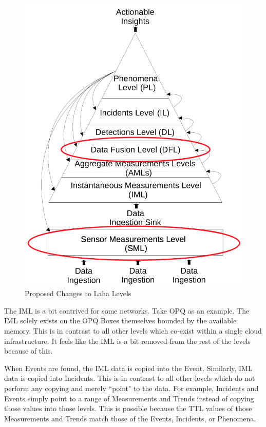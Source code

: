 \begin{figure}
    \centering
    \includegraphics[width=\linewidth]{figures/add_laha_levels.png}
    \caption{Proposed Changes to Laha Levels}
    \label{fig:add_laha_levels}
\end{figure}

The IML is a bit contrived for some networks. Take OPQ as an example. The IML solely exists on the OPQ Boxes themselves bounded by the available memory. This is in contrast to all other levels which co-exist within a single cloud infrastructure. It feels like the IML is a bit removed from the rest of the levels because of this.

When Events are found, the IML data is copied into the Event. Similarly, IML data is copied into Incidents. This is in contrast to all other levels which do not perform any copying and merely ``point" to the data. For example, Incidents and Events simply point to a range of Measurements and Trends instead of copying those values into those levels. This is possible because the TTL values of those Measurements and Trends match those of the Events, Incidents, or Phenomena.

